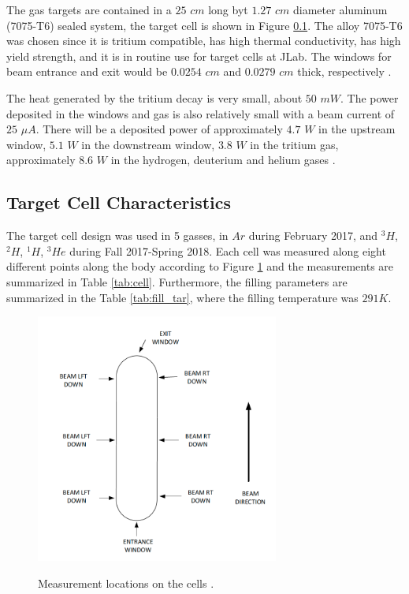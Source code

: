 \documentclass[preprint,12pt]{elsarticle}
\begin{document}
The gas targets are contained in a $25$ $cm$ long byt $1.27$ $cm$ diameter aluminum (7075-T6) sealed system, the target cell is shown in Figure \ref{}. The alloy 7075-T6 was chosen since it is tritium compatible, has high thermal conductivity, has high yield strength, and it is in routine use for target cells at JLab. The windows for beam entrance and exit would be $0.0254$ $cm$ and $0.0279$ $cm$ thick, respectively \cite{celldes}. 


The heat generated by the tritium decay is very small, about $50$ $mW$. The power deposited in the windows and gas is also relatively small with a beam current of $25$ $\mu A$. There will be a deposited power of approximately $4.7$ $W$ in the upstream window, $5.1$ $W$ in the downstream window, $3.8$ $W$ in the tritium gas, approximately $8.6$ $W$ in the hydrogen, deuterium and helium gases \cite{celldes}. 


\subsection{Target Cell Characteristics}

The target cell design was used in 5 gasses, in $Ar$ during February 2017, and $^{3}H$, $^{2}H$, $^{1}H $, $^{3}He$ during Fall 2017-Spring 2018. Each cell was measured along eight different points along the body according to Figure \ref{fig:cellconfig} and the measurements are summarized in Table \ref{tab:cell}. Furthermore, the filling parameters are summarized in the Table \ref{tab:fill_tar}, where the filling temperature was $291K$.

\begin{figure}
\centering
  \includegraphics[width=8cm]{images/tgt_measurements.png}\\
  \caption{Measurement locations on the cells \cite{cellconfig}. 
 }\label{fig:cellconfig}
\end{figure}
\end{document}
